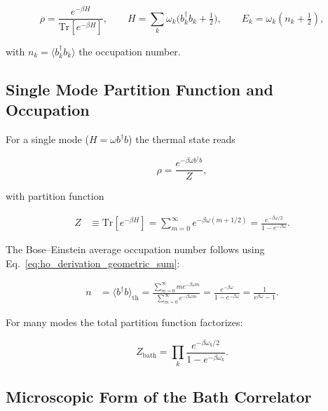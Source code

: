 \begin{equation} \label{eq:ho_gibbs_state}
	\rho = \frac{e^{-\beta H}}{\mathrm{Tr}[e^{-\beta H}]}, \qquad H=\sum_k \omega_k \Big(b_k^{\dagger} b_k + \tfrac{1}{2}\Big), \qquad E_k = \omega_k (n_k + \tfrac{1}{2}),
\end{equation}

\noindent
with $n_k = \langle b_k^{\dagger} b_k \rangle$ the occupation number.


\subsection{Single Mode Partition Function and Occupation}
\label{subsec:single_mode}

\noindent
For a single mode ($H=\omega b^{\dagger} b$) the thermal state reads

\begin{equation} \label{eq:ho_single_mode_density_matrix}
	\rho = \frac{e^{-\beta \omega b^{\dagger} b}}{Z},
\end{equation}

\noindent
with partition function

\begin{align} \label{eq:ho_partition_function}
	Z & \equiv \mathrm{Tr}[e^{-\beta H}] = \sum_{m=0}^{\infty} e^{-\beta \omega (m+1/2)} = \frac{e^{-\beta \omega/2}}{1 - e^{-\beta \omega}}.
\end{align}

\noindent
The Bose--Einstein average occupation number follows using Eq.~\eqref{eq:ho_derivation_geometric_sum}:

\begin{align} \label{eq:ho_expectation_number_operator}
	n & = \langle b^{\dagger} b \rangle_{\text{th}} = \frac{\sum_{m=0}^{\infty} m e^{-\beta \omega m}}{\sum_{m=0}^{\infty} e^{-\beta \omega m}} = \frac{e^{-\beta \omega}}{1-e^{-\beta \omega}} = \frac{1}{e^{\beta \omega}-1}.
\end{align}

\noindent
For many modes the total partition function factorizes:

\begin{equation} \label{eq:ho_generalized_partition_function}
	Z_{\text{bath}} = \prod_k \frac{e^{-\beta \omega_k /2}}{1 - e^{-\beta \omega_k}}.
\end{equation}


\subsection{Microscopic Form of the Bath Correlator}
\label{subsec:microscopic_bath_correlator}

